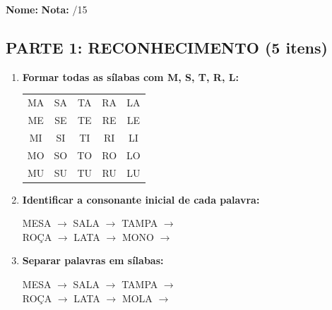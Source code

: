 \begin{exercicio}

\noindent\textbf{Nome:} \underline{\hspace{4cm}} \quad \textbf{Nota:} \underline{\hspace{1cm}}/15

\subsection*{PARTE 1: RECONHECIMENTO (5 itens)}

\begin{enumerate}
  \item \textbf{Formar todas as sílabas com M, S, T, R, L:}
  \begin{center}
  \begin{tabular}{ccccc}
  MA & SA & TA & RA & LA \\
  ME & SE & TE & RE & LE \\
  MI & SI & TI & RI & LI \\
  MO & SO & TO & RO & LO \\
  MU & SU & TU & RU & LU
  \end{tabular}
  \end{center}

  \item \textbf{Identificar a consonante inicial de cada palavra:}
  \begin{center}
  MESA $\rightarrow$ \underline{\hspace{1cm}} \quad SALA $\rightarrow$ \underline{\hspace{1cm}} \quad TAMPA $\rightarrow$ \underline{\hspace{1cm}} \\
  ROÇA $\rightarrow$ \underline{\hspace{1cm}} \quad LATA $\rightarrow$ \underline{\hspace{1cm}} \quad MONO $\rightarrow$ \underline{\hspace{1cm}}
  \end{center}

  \item \textbf{Separar palavras em sílabas:}
  \begin{center}
  MESA $\rightarrow$ \underline{\hspace{1.5cm}} \quad SALA $\rightarrow$ \underline{\hspace{1.5cm}} \quad TAMPA $\rightarrow$ \underline{\hspace{1.5cm}} \\
  ROÇA $\rightarrow$ \underline{\hspace{1.5cm}} \quad LATA $\rightarrow$ \underline{\hspace{1.5cm}} \quad MOLA $\rightarrow$ \underline{\hspace{1.5cm}}
  \end{center}


\end{enumerate}
\end{exercicio}
